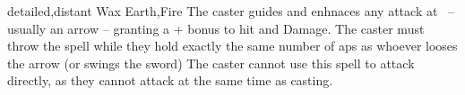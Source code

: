   {detailed,distant}%
  {Wax}%
  {Earth,Fire}%
  {}%
  {The caster guides and enhnaces any attack at \spellRange\ -- usually an arrow -- granting a + bonus to hit and Damage.
    The caster must throw the spell while they hold exactly the same number of \glspl{ap} as whoever looses the arrow (or swings the sword)}%
  {The caster cannot use this spell to attack directly, as they cannot attack at the same time as casting.}
